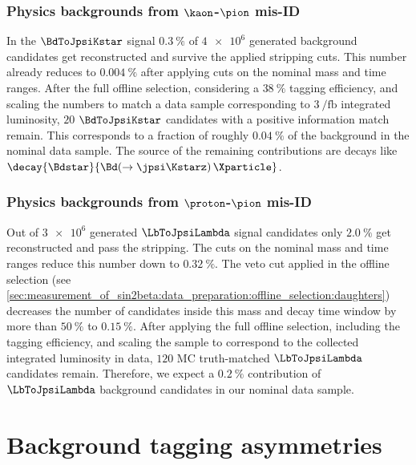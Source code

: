 \subsubsection{Physics backgrounds from $\kaon$-$\pion$ mis-ID}
\label{sec:measurement_of_sin2beta:physic_backgrounds:physic_backgrounds:kstar}

In the $\BdToJpsiKstar$ signal \MC $\SI{0.3}{\percent}$ of $\num{4e6}$ generated
background candidates get reconstructed and survive the applied stripping cuts.
This number already reduces to $\SI{0.004}{\percent}$ after applying cuts on the
nominal mass and time ranges. After the full offline selection, considering a
$\SI{38}{\percent}$ tagging efficiency, and scaling the numbers to match a data
sample corresponding to $\SI[separate-uncertainty=true]{3}{\per\femto\barn}$
integrated luminosity, $\num{20}$ $\BdToJpsiKstar$ candidates with a positive
\MC information match remain. This corresponds to a fraction of roughly
$\SI{0.04}{\percent}$ of the background in the nominal data sample. The source
of the remaining contributions are \eg decays like
$\decay{\Bdstar}{\Bd(\to\jpsi\Kstarz)\,\Xparticle}$.

\subsubsection{Physics backgrounds from $\proton$-$\pion$ mis-ID}
\label{sec:measurement_of_sin2beta:physic_backgrounds:physic_backgrounds:lambda}

Out of $\num{3e6}$ generated $\LbToJpsiLambda$ signal candidates only
$\SI{2.0}{\percent}$ get reconstructed and pass the stripping. The cuts on the
nominal mass and time ranges reduce this number down to $\SI{0.32}{\percent}$.
The veto cut applied in the offline selection (see
\cref{sec:measurement_of_sin2beta:data_preparation:offline_selection:daughters})
decreases the number of candidates inside this mass and decay time window by
more than $\SI{50}{\percent}$ to $\SI{0.15}{\percent}$. After applying the full
offline selection, including the tagging efficiency, and scaling the sample to
correspond to the collected integrated luminosity in data, $\num{120}$ MC
truth-matched $\LbToJpsiLambda$ candidates remain. Therefore, we expect a
$\SI{0.2}{\percent}$ contribution of $\LbToJpsiLambda$ background candidates in
our nominal data sample.

\section{Background tagging asymmetries}
\label{sec:measurement_of_sin2beta:physic_backgrounds:tagging_asymmetries}
